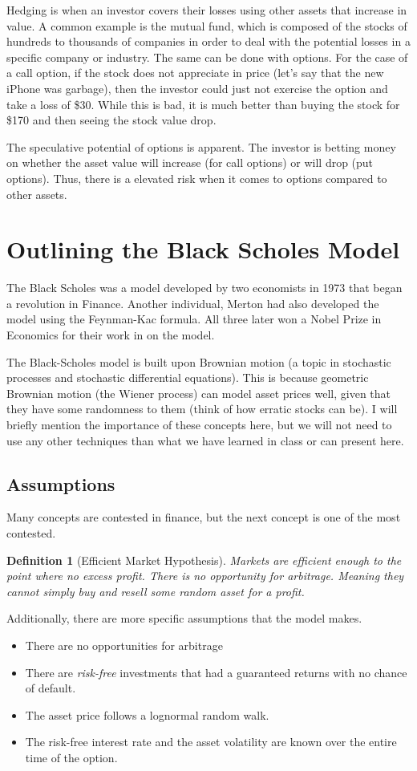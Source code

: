 \documentclass{article}
\newtheorem{definition}{Definition}[section]
\begin{document}
Hedging is when an investor covers their losses using other assets that increase in value. A common example is the mutual fund, which is composed
of the stocks of hundreds to thousands of companies in order to deal with the potential losses in a specific company or industry. The same can be done with options.
For the case of a call option, if the stock does not appreciate in price (let's say that the new iPhone was garbage), then the investor could just not exercise the option and take a loss of \$30.
While this is bad, it is much better than buying the stock for \$170 and then seeing the stock value drop. 

The speculative potential of options is apparent. The investor is betting money on whether the asset value will increase (for call options) or will drop (put options). Thus, there is a elevated risk when it comes to options compared to other assets.




\section{Outlining the Black Scholes Model}
The Black Scholes was a model developed by two economists in 1973 that began a revolution in Finance. Another individual, Merton had also developed the model using the Feynman-Kac formula. All three later won a Nobel Prize in Economics for their work in on the model.

The Black-Scholes model is built upon Brownian motion (a topic in stochastic processes and stochastic differential equations). This is because geometric Brownian motion (the Wiener process) can model asset prices well, given that they have some randomness to them (think of how erratic stocks can be). I will briefly mention the importance of these concepts here, but we will not need to use any other techniques than what we have learned in class or can present here. \cite{yoo_stochastic_2017}

\subsection*{Assumptions}
Many concepts are contested in finance, but the next concept is one of the most contested.
\begin{definition}[Efficient Market Hypothesis]
    Markets are efficient enough to the point where no excess profit. There is no opportunity for arbitrage. Meaning they cannot simply buy and resell some random asset for a profit.
\end{definition}
Additionally, there are more specific assumptions that the model makes.
\begin{itemize}
\item There are no opportunities for arbitrage
\item There are \emph{risk-free} investments that had a guaranteed returns with no chance of default.
\item The asset price follows a lognormal random walk.
\item The risk-free interest rate and the asset volatility are known over the entire time of the option.
\end{itemize}
\end{document}
